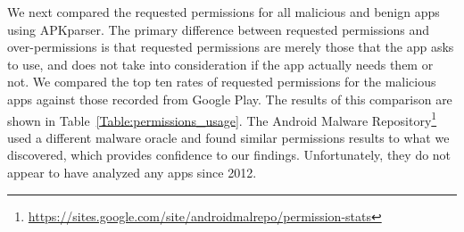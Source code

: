 \documentclass{sig-alternate-05-2015}
\begin{document}





We next compared the requested permissions for all malicious and benign apps using APKparser. The primary difference between requested permissions and over-permissions is that requested permissions are merely those that the app asks to use, and does not take into consideration if the app actually needs them or not. We compared the top ten rates of requested permissions for the malicious apps against those recorded from Google Play. The results of this comparison are shown in Table~\ref{Table:permissions_usage}. The Android Malware Repository\footnote{\url{https://sites.google.com/site/androidmalrepo/permission-stats}} used a different malware oracle and found similar permissions results to what we discovered, which provides confidence to our findings. Unfortunately, they do not appear to have analyzed any apps since 2012.





\end{document}
